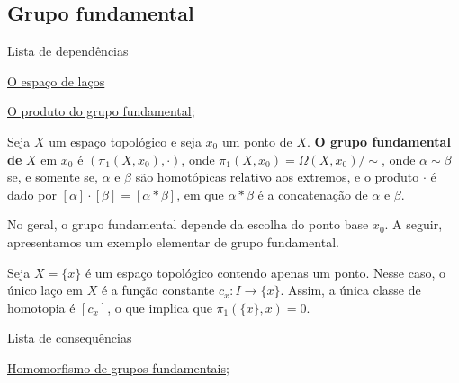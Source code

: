 \subsection{Grupo fundamental}
\label{grupo-fundamental-def}
\begin{titlemize}{Lista de dependências}
	\item \hyperref[espaco-lacos-def]{O espaço de laços}
	\item \hyperref[produto-bem-definido-prop]{O produto do grupo fundamental};\\ %
\end{titlemize}
\begin{defi}
    Seja $X$ um espaço topológico e seja $x_0$ um ponto de $X.$ \textbf{O grupo fundamental de} $X$ em $x_0$ é $(\pi_1(X,x_0),\cdot)$, onde $\pi_1(X,x_0) = \Omega(X,x_0)/\sim$, onde $\alpha \sim \beta$ se, e somente se, $\alpha$ e $\beta$ são homotópicas relativo aos extremos, e o produto $\cdot$ é dado por $[\alpha]\cdot[\beta] = [\alpha \ast \beta]$, em que $\alpha \ast \beta$ é a concatenação de $\alpha$ e $\beta$.
\end{defi}

No geral, o grupo fundamental depende da escolha do ponto base $x_0$. A seguir, apresentamos um exemplo elementar de grupo fundamental.
\begin{ex}
    Seja $X=\{x\}$ é um espaço topológico contendo apenas um ponto. Nesse caso, o único laço em $X$ é a função constante $c_x:I\rightarrow \{x\}$. Assim, a única classe de homotopia é $[c_x]$, o que implica que $\pi_1(\{x\},x)=0$.
\end{ex}

\begin{titlemize}{Lista de consequências}
	\item \hyperref[hom-grupo-fundamental]{Homomorfismo de grupos fundamentais};%
\end{titlemize}
